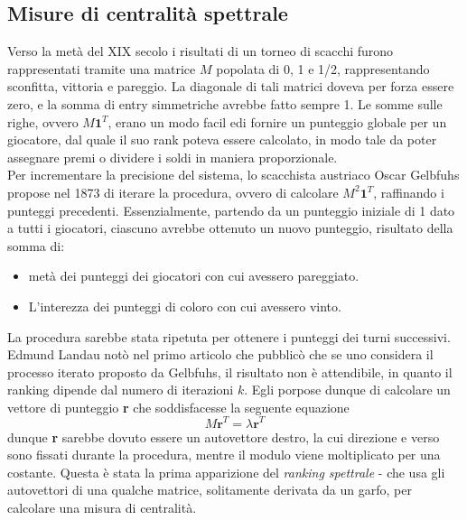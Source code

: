 \subsection{Misure di centralità spettrale}
Verso la metà del XIX secolo i risultati di un torneo di scacchi furono rappresentati tramite una matrice $M$ popolata di 0, 1 e 1/2, rappresentando sconfitta, vittoria e pareggio. La diagonale di tali matrici doveva per forza essere zero, e la somma di entry simmetriche avrebbe fatto sempre 1. Le somme sulle righe, ovvero $M\textbf{1}^T$, erano un modo facil edi fornire un punteggio globale per un giocatore, dal quale il suo rank poteva essere calcolato, in modo tale da poter assegnare premi o dividere i soldi in maniera proporzionale.\\
Per incrementare la precisione del sistema, lo scacchista austriaco Oscar Gelbfuhs propose nel 1873 di iterare la procedura, ovvero di calcolare $M^2\textbf{1}^T$, raffinando i punteggi precedenti. Essenzialmente, partendo da un punteggio iniziale di 1 dato a tutti i giocatori, ciascuno avrebbe ottenuto un nuovo punteggio, risultato della somma di:
\begin{itemize}
    \item metà dei punteggi dei giocatori con cui avessero pareggiato.
    \item L'interezza dei punteggi di coloro con cui avessero vinto.
\end{itemize}
La procedura sarebbe stata ripetuta per ottenere i punteggi dei turni successivi.\\
Edmund Landau %
notò nel primo articolo che pubblicò %
che se uno considera il processo iterato proposto da Gelbfuhs, il risultato non è attendibile, in quanto il ranking dipende dal numero di iterazioni $k$. Egli porpose dunque di calcolare un vettore di punteggio \textbf{r} che soddisfacesse la seguente equazione
\begin{equation}
    M\textbf{r}^T = \lambda \textbf{r}^T
\end{equation}
dunque \textbf{r} sarebbe dovuto essere un autovettore destro, la cui direzione e verso sono fissati durante la procedura, mentre il modulo viene moltiplicato per una costante. Questa è stata la prima apparizione del \textit{ranking spettrale} - che usa gli autovettori di una qualche matrice, solitamente derivata da un garfo, per calcolare una misura di centralità.
